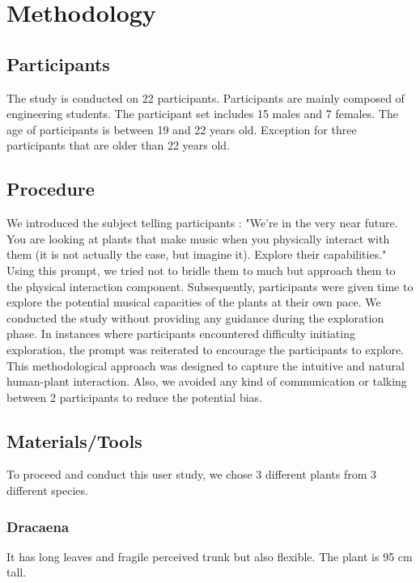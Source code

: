 
\section{Methodology}

\subsection{Participants}

The study is conducted on 22 participants. Participants are mainly composed of engineering students. The participant set includes 15 males and 7 females.
The age of participants is between 19 and 22 years old. Exception for three participants that are older than 22 years old. 


\subsection{Procedure}

We introduced the subject telling participants : 
"We're in the very near future. You are looking at plants that make music when you physically interact with them (it is not actually the case, but imagine it). Explore their capabilities."
Using this prompt, we tried not to bridle them to much but approach them to the physical interaction component.
Subsequently, participants were given time to explore the potential musical capacities of the plants at their own pace.
We conducted the study without providing any guidance during the exploration phase.
In instances where participants encountered difficulty initiating exploration, the prompt was reiterated to encourage the participants to explore.
This methodological approach was designed to capture the intuitive and natural human-plant interaction.
Also, we avoided any kind of communication or talking between 2 participants to reduce the potential bias.


\subsection{Materials/Tools}

To proceed and conduct this user study, we chose 3 different plants from 3 different species.

\newpage

\subsubsection{Dracaena}
It has long leaves and fragile perceived trunk but also flexible. The plant is 95 cm tall.

